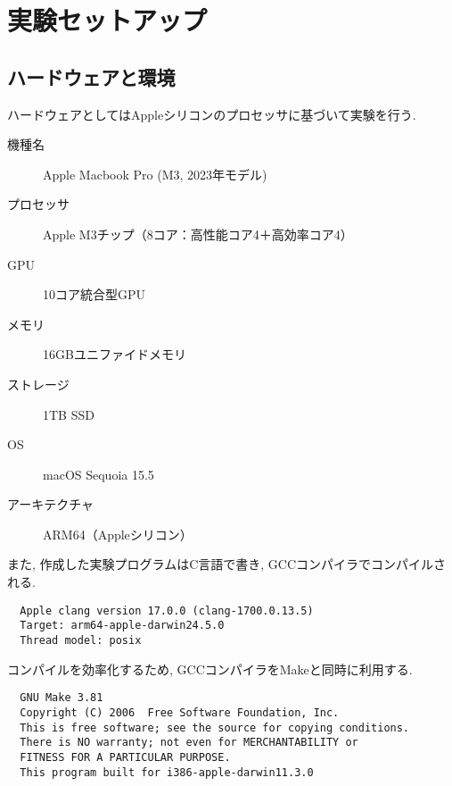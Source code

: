\documentclass[a4j, 11pt]{jarticle}
\begin{document}
\section{実験セットアップ}
\subsection{ハードウェアと環境}
ハードウェアとしてはAppleシリコンのプロセッサに基づいて実験を行う. 
\begin{description}
  \item[機種名] Apple Macbook Pro (M3, 2023年モデル)
  \item[プロセッサ] Apple M3チップ（8コア：高性能コア4＋高効率コア4）
  \item[GPU] 10コア統合型GPU
  \item[メモリ] 16GBユニファイドメモリ
  \item[ストレージ] 1TB SSD
  \item[OS] macOS Sequoia 15.5
  \item[アーキテクチャ] ARM64（Appleシリコン） 
\end{description}
また, 作成した実験プログラムはC言語で書き, GCCコンパイラでコンパイルされる. 
\begin{verbatim}
  Apple clang version 17.0.0 (clang-1700.0.13.5)
  Target: arm64-apple-darwin24.5.0
  Thread model: posix
\end{verbatim}
コンパイルを効率化するため, GCCコンパイラをMakeと同時に利用する. 
\begin{verbatim}
  GNU Make 3.81
  Copyright (C) 2006  Free Software Foundation, Inc.
  This is free software; see the source for copying conditions.
  There is NO warranty; not even for MERCHANTABILITY or 
  FITNESS FOR A PARTICULAR PURPOSE.
  This program built for i386-apple-darwin11.3.0
\end{verbatim}
\end{document}

